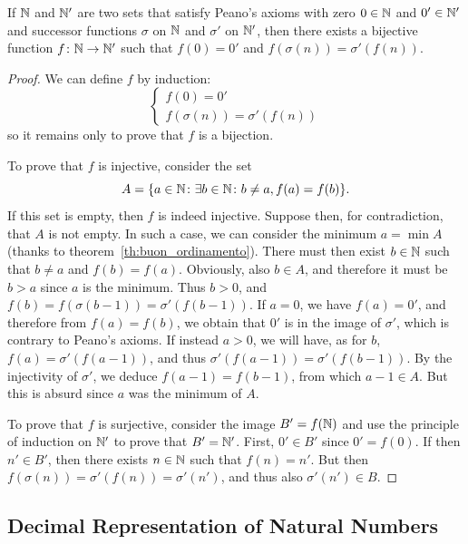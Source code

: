 \begin{theorem}
  \label{th:unicitaN}%
  If ${\mathbb N}$ and ${\mathbb N}'$ are two sets that satisfy Peano's axioms 
  with zero $0\in {\mathbb N}$ and $0'\in {\mathbb N}'$ and successor functions 
  $\sigma$ on ${\mathbb N}$ and $\sigma'$ on ${\mathbb N}'$, then
  there exists a bijective function $f\colon {\mathbb N}\to {\mathbb N}'$ such that 
  $f(0) = 0'$ and $f(\sigma(n)) = \sigma'(f(n))$.
\end{theorem}
%
\begin{proof}
We can define $f$ by induction:
\[
\begin{cases}
  f(0) = 0' \\ 
  f(\sigma(n)) = \sigma'(f(n))
\end{cases}  
\]
so it remains only to prove that $f$ is a bijection.

To prove that $f$ is injective, consider the set 
\[
  A={\left\{ a\in {\mathbb N}\colon \exists b\in {\mathbb N}\colon b\neq a, f(a)=f(b) \right\}}.
\]
If this set is empty, then $f$ is indeed injective.
Suppose then, for contradiction, that $A$ is not empty.
In such a case, we can consider the minimum $a=\min A$ 
(thanks to theorem~\ref{th:buon_ordinamento}).
There must then exist $b\in {\mathbb N}$ such that $b\neq a$ and $f(b)=f(a)$.
Obviously, also $b\in A$, and therefore it must be $b>a$ since
$a$ is the minimum. Thus $b>0$, and $f(b) = f(\sigma(b-1))
=\sigma'(f(b-1))$. If $a=0$, we have $f(a)=0'$, and therefore from $f(a)=f(b)$, 
we obtain that $0'$ is in the image of $\sigma'$, which is contrary 
to Peano's axioms. 
If instead $a>0$, we will have, as for $b$,
$f(a)=\sigma'(f(a-1))$, and thus $\sigma'(f(a-1)) = \sigma'(f(b-1))$.
By the injectivity of $\sigma'$, we deduce $f(a-1)=f(b-1)$, from which 
$a-1 \in A$. But this is absurd since $a$ was the minimum of $A$.

To prove that $f$ is surjective, consider the image 
$B'=f({\mathbb N})$ and use the principle of induction on ${\mathbb N}'$ 
to prove that $B'={\mathbb N}'$.
First, $0'\in B'$ since $0'=f(0)$.
If then $n'\in B'$, then there exists $n\in {\mathbb N}$ such that $f(n)=n'$.
But then $f(\sigma(n))=\sigma'(f(n))=\sigma'(n')$, 
and thus also $\sigma'(n')\in B$. 
\end{proof}

\subsection{Decimal Representation of Natural Numbers}

